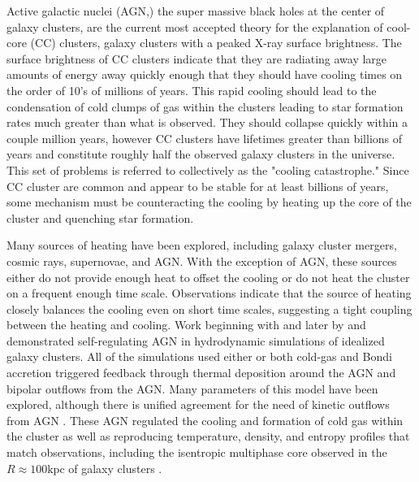 \documentclass[iop,apjl, twocolappendix]{emulateapj}   %
\begin{document}

Active galactic nuclei (AGN,) the super massive black holes at the center of
galaxy clusters, are the current most accepted theory for the explanation of
cool-core (CC) clusters, galaxy clusters with a peaked X-ray surface
brightness.  The surface brightness of CC clusters indicate that they are
radiating away large amounts of energy away quickly enough that they should have
cooling times on the order of 10's of millions of years. This rapid cooling
should lead to the condensation of cold clumps of gas within the clusters
leading to star formation rates much greater than what is observed. They should
collapse quickly within a couple million years, however CC clusters have
lifetimes greater than billions of years and constitute roughly half the
observed galaxy clusters in the universe. This set of problems is referred to
collectively as the "cooling catastrophe." Since CC cluster are common and
appear to be stable for at least billions of years, some mechanism must be
counteracting the cooling by heating up the core of the cluster and quenching
star formation.

Many sources of heating have been explored, including galaxy cluster mergers,
cosmic rays, supernovae, and AGN. With the exception of AGN, these sources
either do not provide enough heat to offset the cooling or do not heat the
cluster on a frequent enough time scale. Observations indicate that the source
of heating closely balances the cooling even on short time scales, suggesting a
tight coupling between the heating and cooling. Work beginning with
\citep{gaspari_dance_2011} and later by \citep{li_cooling_2015} and
\citep{meece_triggering_2017} demonstrated self-regulating AGN in hydrodynamic
simulations of idealized galaxy clusters. All of the simulations used either or
both cold-gas and Bondi accretion triggered feedback through thermal deposition
around the AGN and bipolar outflows from the AGN. Many parameters of this model
have been explored, although there is unified agreement for the need of kinetic
outflows from AGN \cite{meece_jr_agn_2016,meece_triggering_2017}. These AGN
regulated the cooling and formation of cold gas within the cluster as well as
reproducing temperature, density, and entropy profiles that match observations,
including the isentropic multiphase core observed in the $R\approx 100 \text{
  kpc}$ of galaxy clusters \cite{gaspari_cause_2012}.
\end{document}
